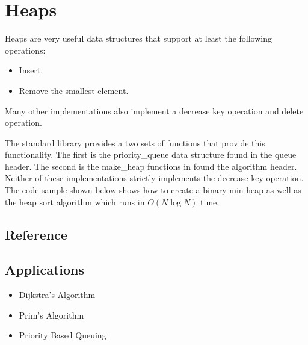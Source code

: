 \section{Heaps}
Heaps are very useful data structures that support at least the following operations:

\begin{itemize}
	\item Insert.
	\item Remove the smallest element.
\end{itemize}

Many other implementations also implement a decrease key operation and delete operation.

The standard library provides a two sets of functions that provide this functionality.
The first is the priority\_queue data structure found in the queue header.
The second is the make\_heap functions in found the algorithm header.
Neither of these implementations strictly implements the decrease key operation.
The code sample shown below shows how to create a binary min heap as well as the heap sort algorithm which runs in $O(N \log N)$ time.

\subsection{Reference}

\subsection{Applications}
\begin{itemize}
	\item Dijkstra's Algorithm
	\item Prim's Algorithm
	\item Priority Based Queuing
\end{itemize}
